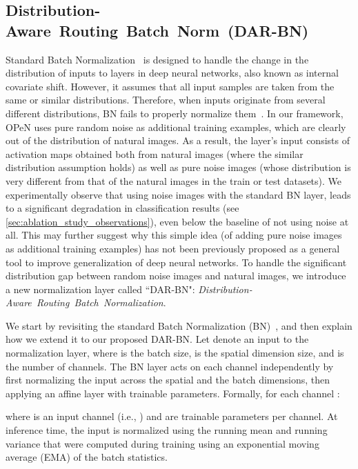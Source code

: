 \documentclass[nohyperref]{article}
\theoremstyle{plain}
\theoremstyle{definition}
\theoremstyle{remark}
\begin{document}
\subsection{\mbox{\bf {\normalsize Distribution-Aware Routing Batch Norm (DAR-BN)}}}\label{sec:dar_bn}
\label{sec:DAR-BN}
Standard Batch Normalization~\cite{ioffe2015batch} is designed to handle the change in the distribution of inputs to layers in deep neural networks, also known as internal covariate shift. However, it assumes that all input samples are taken from the same or similar distributions. Therefore, when inputs originate from several different distributions, BN fails to properly normalize them~\cite{he2019data, xie2020adversarial, xie2019intriguing}. In our framework, OPeN uses pure random noise as additional training examples, which are clearly out of the distribution of natural images. As a result, the layer's input consists of activation maps obtained both from natural images (where the similar distribution assumption holds) as well as pure noise images (whose distribution is very different from that of the natural images in the train or test datasets). We experimentally observe that using noise images with the standard BN layer, leads to a significant degradation in classification results (see \cref{sec:ablation_study_observations}), even below the baseline of not using noise at all. 
This may further suggest why this simple idea (of adding pure noise images as additional training examples) has not been previously proposed as a general tool to improve generalization of deep neural networks. 
To handle the significant distribution gap between random noise images and natural images, we introduce a new normalization layer called ``DAR-BN": \mbox{\textit{Distribution-Aware Routing Batch Normalization}}.


We start by revisiting the standard Batch Normalization (BN)~\cite{ioffe2015batch}, and then explain how we extend it to our proposed DAR-BN. Let  denote an input to the normalization layer, where  is the batch size,  is the spatial dimension size, and  is the number of channels. The BN layer acts on each channel independently by first normalizing the input across the spatial and the batch dimensions, then applying an affine layer with trainable parameters. Formally, for each channel :
\vspace*{-0.2cm}

\vspace*{-0.2cm}

where   is an input channel (i.e., ) and  are trainable parameters per channel. At inference time, the input is normalized using the running mean and running variance that were computed during training using an exponential moving average (EMA) of the batch statistics.
\vspace*{-0.3cm}
\end{document}
